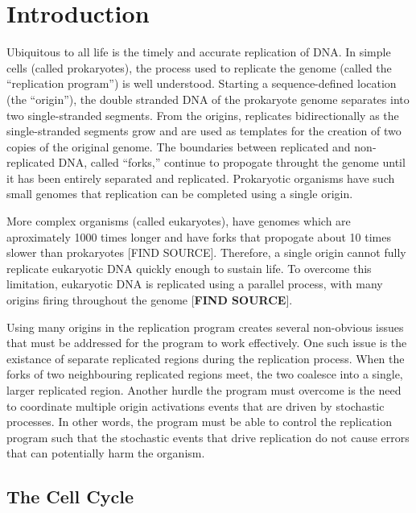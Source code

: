 \chapter{Introduction}

Ubiquitous to all life is the timely and accurate replication of DNA.
In simple cells (called prokaryotes), the process used to replicate the genome (called the ``replication program'') is well understood.
Starting a sequence-defined location (the ``origin''), the double stranded DNA of the prokaryote genome separates into two single-stranded segments.
From the origins, replicates bidirectionally as the single-stranded segments grow and are used as templates for the creation of two copies of the original genome.
The boundaries between replicated and non-replicated DNA, called ``forks,'' continue to propogate throught the genome until it has been entirely separated and replicated.
Prokaryotic organisms have such small genomes that replication can be completed using a single origin.\cite{MolecularCellBiology}

More complex organisms (called eukaryotes), have genomes which are aproximately 1000 times longer and have forks that propogate about 10 times slower than prokaryotes [FIND SOURCE].
Therefore, a single origin cannot fully replicate eukaryotic DNA quickly enough to sustain life.
To overcome this limitation, eukaryotic DNA is replicated using a parallel process, with many origins firing throughout the genome [\textbf{FIND SOURCE}].

Using many origins in the replication program creates several non-obvious issues that must be addressed for the program to work effectively.
One such issue is the existance of separate replicated regions during the replication process.
When the forks of two neighbouring replicated regions meet, the two coalesce into a single, larger replicated region.
Another hurdle the program must overcome is the need to coordinate multiple origin activations events that are driven by stochastic processes.
In other words, the program must be able to control the replication program such that the stochastic events that drive replication do not cause errors that can potentially harm the organism.\cite{eukaryotereview}


	\section{The Cell Cycle}
	
